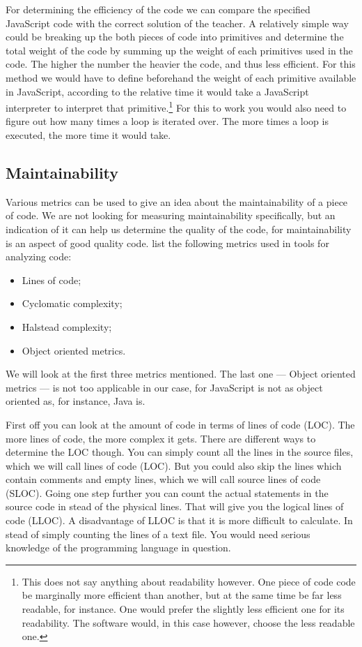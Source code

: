 \documentclass{article}
\begin{document}
For determining the efficiency of the code we can compare the specified
JavaScript code with the correct solution of the teacher. A relatively simple
way could be breaking up the both pieces of code into primitives and determine
the total weight of the code by summing up the weight of each primitives used
in the code. The higher the number the heavier the code, and thus less
efficient. For this method we would have to define beforehand the weight of
each primitive available in JavaScript, according to the relative time it would
take a JavaScript interpreter to interpret that primitive.\footnote{This does
not say anything about readability however. One piece of code code be
marginally more efficient than another, but at the same time be far less
readable, for instance. One would prefer the slightly less efficient one for
its readability. The software would, in this case however, choose the less
readable one.} For this to work you would also need to figure out how many
times a loop is iterated over. The more times a loop is executed, the more time
it would take.

\subsection{Maintainability}

Various metrics can be used to give an idea about the maintainability of a
piece of code. We are not looking for measuring maintainability specifically,
but an indication of it can help us determine the quality of the code, for
maintainability is an aspect of good quality code. \citet{rakic2013problems}
list the following metrics used in tools for analyzing code:
\begin{itemize}
  \item Lines of code;
  \item Cyclomatic complexity;
  \item Halstead complexity;
  \item Object oriented metrics.
\end{itemize}
We will look at the first three metrics mentioned. The last one --- Object
oriented metrics --- is not too applicable in our case, for JavaScript is not
as object oriented as, for instance, Java is.

First off you can look at the amount of code in terms of lines of code
(LOC). The more lines of code, the more complex it gets. There are different
ways to determine the LOC though. You can simply count all the lines in the
source files, which we will call lines of code (LOC). But you could also skip
the lines which contain comments and empty lines, which we will call source
lines of code (SLOC). Going one step further you can count the actual
statements in the source code in stead of the physical lines. That will give
you the logical lines of code (LLOC). A disadvantage of LLOC is that it is more
difficult to calculate. In stead of simply counting the lines of a text
file. You would need serious knowledge of the programming language in question.
\end{document}
